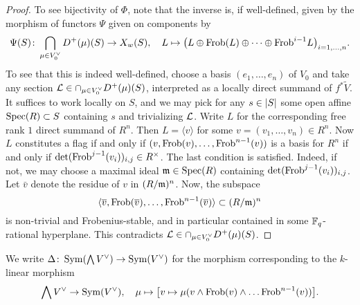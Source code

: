 \documentclass[../main.tex]{subfiles}
\begin{document}
\begin{prop}
\begin{proof}
  To see bijectivity of $\Phi$, note that the inverse is, if well-defined,
  given by the morphism of functors $\Psi$ given on components by 
  \begin{equation*}
    \Psi(S)\colon  \bigcap_{\mu \in V_0^\vee}D^+(\mu)(S) \to X_w(S), \quad L \mapsto 
    \big(L \oplus \mathrm{Frob}(L) \oplus \dots \oplus \mathrm{Frob}^{i-1} L\big)_{i = 1, \dots, n}.
  \end{equation*}
  To see that this is indeed well-defined, choose a basis $(e_1, \dots, e_n)$
  of $V_0$ and take any section $\mathcal{L} \in \cap_{\mu \in
  V_0^\vee}D^+(\mu)(S)$, interpreted as a locally direct summand of $f^* \tilde V$. 
  It suffices to work locally on $S$, and we may pick for any $s \in \lvert S \rvert$
  some open affine $\operatorname{Spec}(R) \subset S$ containing $s$ and trivializing $\mathcal{L}$.
  Write $L$ for the corresponding free rank $1$ direct summand of $R^n$. Then
  $L = \langle v \rangle$ for some $v = (v_1, \dots, v_n) \in R^n$. Now 
  $L$ constitutes a flag if and only if $(v, \mathrm{Frob}(v), \dots, \mathrm{Frob}^{n-1}(v))$
  is a basis for $R^n$ if and only if $\det(\mathrm{Frob}^{j-1}(v_i))_{i,j} \in R^\times$.
  The last condition is satisfied. Indeed, if not, we may 
  choose a maximal ideal $\mathfrak{m} \in \operatorname{Spec}(R)$ containing
  $\det(\mathrm{Frob}^{j-1}(v_i))_{i,j}$. Let $\bar v$ denote the residue of $v$ in
  $(R/\mathfrak{m})^n$. Now, the subspace
  $$\langle \overline v, \mathrm{Frob}(\overline v), \dots, \mathrm{Frob}^{n-1}(\overline v)\rangle \subset (R/\mathfrak{m})^n$$ 
  is non-trivial and Frobenius-stable, and in particular
  contained in some $\mathbb{F}_q$-rational hyperplane. This contradicts $\mathcal{L} \in
  \cap_{\mu \in V_0^\vee}D^+(\mu)(S)$. 
\end{proof}
\end{prop}

We write $\Delta\colon  \operatorname{Sym}(\bigwedge V^\vee) \to \operatorname{Sym}(V^\vee)$ for the morphism corresponding
to the $k$-linear morphism 
\begin{equation*}
  \bigwedge V^\vee \to \operatorname{Sym}(V^\vee), \quad \mu \mapsto \big[v \mapsto 
  \mu(v \wedge \mathrm{Frob}(v) \wedge \dots \mathrm{Frob}^{n-1}(v))\big].
\end{equation*}
\end{document}
